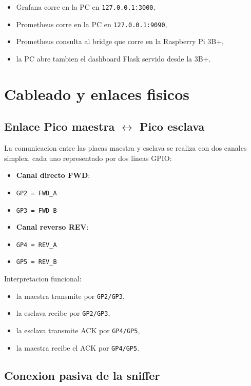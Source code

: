 \documentclass[12pt,a4paper]{report}
\begin{document}
\begin{itemize}
    \item Grafana corre en la PC en \texttt{127.0.0.1:3000},
    \item Prometheus corre en la PC en \texttt{127.0.0.1:9090},
    \item Prometheus consulta al bridge que corre en la Raspberry Pi 3B+,
    \item la PC abre tambien el dashboard Flask servido desde la 3B+.
\end{itemize}

\chapter{Cableado y enlaces fisicos}

\section{Enlace Pico maestra $\leftrightarrow$ Pico esclava}

La comunicacion entre las placas maestra y esclava se realiza con dos canales simplex, cada uno representado por dos lineas GPIO:

\begin{itemize}
    \item \textbf{Canal directo FWD}:
    \item \texttt{GP2 = FWD\_A}
    \item \texttt{GP3 = FWD\_B}
    \item \textbf{Canal reverso REV}:
    \item \texttt{GP4 = REV\_A}
    \item \texttt{GP5 = REV\_B}
\end{itemize}

Interpretacion funcional:

\begin{itemize}
    \item la maestra transmite por \texttt{GP2/GP3},
    \item la esclava recibe por \texttt{GP2/GP3},
    \item la esclava transmite ACK por \texttt{GP4/GP5},
    \item la maestra recibe el ACK por \texttt{GP4/GP5}.
\end{itemize}

\section{Conexion pasiva de la sniffer}
\end{document}

